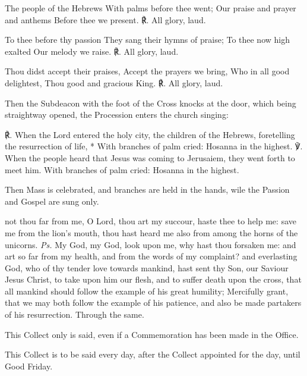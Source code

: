 The people of the Hebrews With palms before thee went; Our praise and prayer and anthems Before thee we present. ℟. All glory, laud.\par
To thee before thy passion They sang their hymns of praise; To thee now high exalted Our melody we raise. ℟. All glory, laud.\par
Thou didst accept their praises, Accept the prayers we bring, Who in all good delightest, Thou good and gracious King. ℟. All glory, laud.\par
\begin{rubric}
    Then the Subdeacon with the foot of the Cross knocks at the door, which being straightway opened, the Procession enters the church singing:
\end{rubric}\par\noindent
℟. When the Lord entered the holy city, the children of the Hebrews, foretelling the resurrection of life, * With branches of palm cried: Hosanna in the highest. ℣. When the people heard that Jesus was coming to Jerusaiem, they went forth to meet him. With branches of palm cried: Hosanna in the highest.
\begin{rubric}
    Then Mass is celebrated, and branches are held in the hands, wile the Passion and Gospel are sung only.
\end{rubric}
\introit
{} not thou far from me, O Lord, thou art my succour, haste thee to help me: save me from the lion's mouth, thou hast heard me also from among the horns of the unicorns. \textit{Ps.} My God, my God, look upon me, why hast thou forsaken me: and art so far from my health, and from the words of my complaint? 
\collect
{} and everlasting God, who of thy tender love towards mankind, hast sent thy Son, our Saviour Jesus Christ, to take upon him our flesh, and to suffer death upon the cross, that all mankind should follow the example of his great humility; Mercifully grant, that we may both follow the example of his patience, and also be made partakers of his resurrection. Through the same.
\begin{rubric}
    This Collect only is said, even if a Commemoration has been made in the Office.
\end{rubric}
\begin{rubric}
    This Collect is to be said every day, after the Collect appointed for the day, until Good Friday.
\end{rubric}
